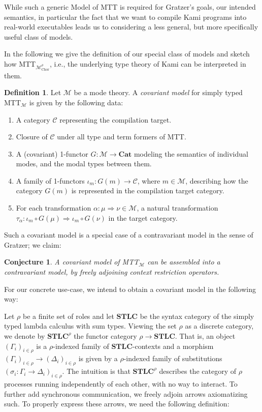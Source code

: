 \documentclass{scrartcl}
\theoremstyle{definition}
\newtheorem{definition}{Definition}
\theoremstyle{plain}
\newtheorem{conjecture}{Conjecture}
\begin{document}
While such a generic Model of MTT is required for Gratzer's goals, our intended
semantics, in particular the fact that we want to compile Kami programs into
real-world executables leads us to considering a less general, but more
specifically useful class of models.

In the following we give the definition of our special class of models and
sketch how MTT${}_{\mathcal{M}^\rho_{\textrm{Chor}}}$, i.e., the underlying type
theory of Kami can be interpreted in them.

\begin{definition}
  Let $\mathcal{M}$ be a mode theory. A \textit{covariant model} for
  simply typed MTT$_{\mathcal{M}}$ is given by the following data:
  \begin{enumerate}
  \item A category $\mathcal{C}$ representing the compilation target.
  \item Closure of $\mathcal{C}$ under all type and term formers of MTT.
  \item A (covariant) 1-functor $G : \mathcal{M} \to \textbf{Cat}$ modeling the semantics of
    individual modes, and the modal types between them.
  \item A family of 1-functors $\iota_m : G(m) \to \mathcal{C}$, where $m \in
    \mathcal{M}$, describing how the category $G(m)$ is represented in the
    compilation target category.
  \item For each transformation $\alpha : \mu \Rightarrow \nu \in \mathcal{M}$,
    a natural transformation
    $\tau_\alpha : \iota_m \circ G(\mu) \Rightarrow \iota_m \circ G(\nu)$ in the
    target category.
  \end{enumerate}
\end{definition}

Such a covariant model is a special case of a contravariant model in the sense of Gratzer; we claim:

\begin{conjecture}
  A covariant model of MTT$_{\mathcal{M}}$ can be assembled into a contravariant
  model, by freely adjoining context restriction operators.
\end{conjecture}

\medskip

For our concrete use-case, we intend to obtain a covariant model in the following way:

Let $\rho$ be a finite set of roles and let $\textbf{STLC}$ be the syntax
category of the simply typed lambda calculus with sum types. Viewing the set
$\rho$ as a discrete category, we denote by $\textbf{STLC}^\rho$ the functor
category $\rho \to \textbf{STLC}$. That is, an object $(\Gamma_i)_{i\in\rho}$
is a $\rho$-indexed family of $\textbf{STLC}$-contexts and a morphism
$(\Gamma_i)_{i\in\rho} \to (\Delta_i)_{i\in\rho}$ is given by a $\rho$-indexed
family of substitutions $(\sigma_i : \Gamma_i \to \Delta_i)_{i\in\rho}$. The
intuition is that $\textbf{STLC}^\rho$ describes the category of $\rho$
processes running independently of each other, with no way to interact. To
further add synchronous communication, we freely adjoin arrows axiomatizing
such. To properly express these arrows, we need the following definition:
\end{document}
